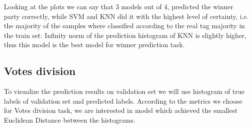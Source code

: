 \documentclass[12pt]{article}
\begin{document}
Looking at the plots we can say that 3 models out of 4, predicted the winner party correctly, while SVM and KNN did it with the highest level of certainty, i.e. the majority of the samples where classified according to the real tag majority in the train set. Infinity norm of the prediction histogram of KNN is slightly higher, thus this model is the best model for winner prediction task.

\newpage
\subsection{Votes division}
To visualize the prediction results on validation set we will use histogram of true labels of validation set and predicted labels. According to the metrics we choose for Votes division task, we are interested in model which achieved the smallest Euclidean Distance between the histograms. 
\end{document}
